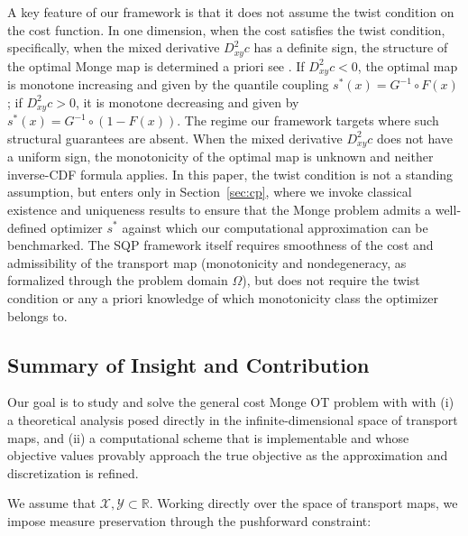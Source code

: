 \documentclass[12pt,leqno]{amsart}
\begin{document}
A key feature of our framework is that it does not assume the twist condition on the cost function. In one dimension, when the cost satisfies the twist condition, specifically, when the mixed derivative $D^2_{xy}c$ has a definite sign, the structure of the optimal Monge map is determined a priori see \citep[Theorem 3.2]{guillen2010five}. If $D^2_{xy}c<0$, the optimal map is monotone increasing and given by the quantile coupling $s^*(x)=G^{-1}\circ F(x)$; if $D^2_{xy}c>0$, it is monotone decreasing and given by $s^*(x)=G^{-1}\circ(1-F(x))$. 
The regime our framework targets where such structural guarantees are absent. When the mixed derivative $D^2_{xy}c$ does not have a uniform sign, the monotonicity of the optimal map is unknown and neither inverse-CDF formula applies. In this paper, the twist condition is not a standing assumption, but enters only in Section~\ref{sec:cp}, where we invoke classical existence and uniqueness results to ensure that the Monge problem admits a well-defined optimizer $s^*$ against which our computational approximation can be benchmarked. The SQP framework itself requires smoothness of the cost and admissibility of the transport map (monotonicity and nondegeneracy, as formalized through the problem domain $\Omega$), but does not require the twist condition or any a priori knowledge of which monotonicity class the optimizer belongs to.

\subsection{Summary of Insight and Contribution}
Our goal is to study and solve the general cost Monge OT problem with with (i) a theoretical analysis posed directly in the infinite-dimensional space of transport maps, and
(ii) a computational scheme that is implementable and whose objective values provably approach the true objective as the approximation and discretization is refined. 

We assume that $\mathcal{X}, \mathcal{Y} \subset \mathbb R$. Working directly over the space of transport maps, we impose measure preservation through the pushforward constraint:
\end{document}
